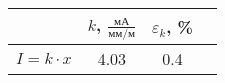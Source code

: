 \begin{tabular}{l|ccc}
	\toprule
	 & $k$, $\frac{\text{мА}}{\text{мм}/\text{м}}$ & $\varepsilon_k$, \% \\ \midrule
	$I=k\cdot{x}$ & 4.03 & 0.4 \\
\bottomrule
\end{tabular}